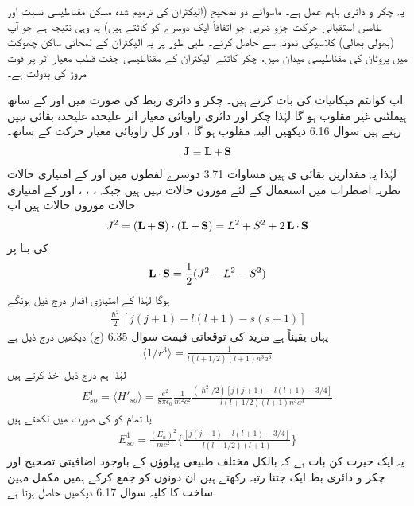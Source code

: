 یہ چکر و دائری  باہم عمل ہے۔ ماسوائے دو تصحیح (الیکٹران کی ترمیم شدہ مسکن مقناطیسی نسبت  اور طامس استقبالی حرکت جزو ضربی جو اتفاقاً ایک دوسرے کو کاٹتے  ہیں)  یہ وہی نتیجہ ہے جو آپ (بھولی بھالی)  کلاسیکی نمونہ سے حاصل کرتے۔ طبی طور پر یہ الیکٹران کے لمحاتی ساکن چھوکٹ  میں پروٹان کی مقناطیسی میدان میں، چکر کاٹتے الیکٹران کے مقناطیسی جفت قطب معیار اثر پر قوت مروڑ کی بدولت ہے۔

 اب کوانٹم میکانیات کی بات کرتے ہیں۔ چکر و دائری ربط کی صورت میں  اور  کے ساتھ ہیملٹنی غیر مقلوب ہو گا لہٰذا چکر اور دائری زاویائی معیار اثر علیحدہ علیحدہ   بقائی  نہیں رہتے ہیں سوال 6.16 دیکھیں البتہ  مقلوب ہو گا ،  اور کل زاویائی معیار حرکت کے ساتھ۔
\begin{align}
\operatorname{\mathbf{J}} \equiv \operatorname{\mathbf{L}} + \operatorname{\mathbf{S}}
\end{align}
 لہٰذا   یہ مقداریں   بقائی ی ہیں مساوات 3.71 دوسرے لفظوں میں  اور  کے امتیازی حالات نظریہ اضطراب میں استعمال کے لئے موزوں حالات نہیں ہیں جبکہ ، ، ، اور  کے امتیازی حالات موزوں حالات ہیں اب 
\begin{align*}
J^2 = (\operatorname{\mathbf{L}} + \operatorname{\mathbf{S}}) \cdot (\operatorname{\mathbf{L}} + \operatorname{\mathbf{S}}) = L^2 + S^2 + 2 \operatorname{\mathbf{L}} \cdot \operatorname{\mathbf{S}}
\end{align*}
کی بنا پر 
\begin{align}
\operatorname{\mathbf{L}} \cdot \operatorname{\mathbf{S}} = \frac{1}{2} (J^2 - L^2 - S^2)
\end{align}
ہوگا  لہٰذا    کے امتیازی اقدار درج ذیل ہونگے 
\begin{align*}
\frac{\hslash^2}{2} [j (j + 1) - l(l + 1) - s(s + 1)]
\end{align*}
یہاں یقیناً  ہے مزید  کی توقعاتی قیمت سوال 6.35 (ج) دیکھیں درج ذیل ہے 
\begin{align}
\langle 1/r^3 \rangle = \frac{1}{l(l + 1/2) (l + 1) n^3 a^3} 
\end{align}
 لہٰذا   ہم درج ذیل اخذ کرتے ہیں 
\begin{align*}
E_{so}^1 = \langle H'_{so} \rangle = \frac{e^2}{8 \pi \epsilon_0} \frac{1}{m^2 c^2} \frac{(\hslash^2 /2) [j(j + 1) - l(l + 1) - 3/4]}{l(l + 1/2)(l + 1)n^3 a^3}
\end{align*} 
یا تمام کو  کی صورت میں لکھتے ہیں 
\begin{align}
E^1_{so} = \frac{(E_n)^2}{mc^2} \big \{ \frac{[j(j + 1) - l(l + 1) - 3/4]}{l(l + 1/2)(l + 1)} \big \}
\end{align}
یہ ایک حیرت کن بات ہے کہ بالکل مختلف طبیعی پہلوؤں کے باوجود اضافیتی تصحیح اور چکر و دائری بط ایک جتنا رتبہ  رکھتے ہیں ان دونوں کو جمع کرکے ہمیں مکمل مہین ساخت کا کلیہ سوال 6.17 دیکھیں حاصل ہوتا ہے 

